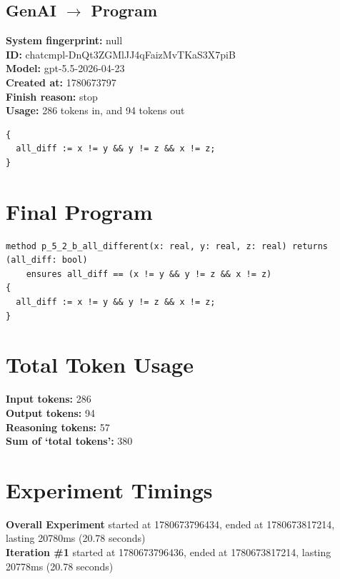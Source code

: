 \documentclass{article}
\begin{document}
\subsection*{GenAI $\rightarrow$ Program}
\textbf{System fingerprint: }null
\\\textbf{ID: }chatcmpl-DnQt3ZGMlJJ4qFaizMvTKaS3X7piB
\\\textbf{Model: }gpt-5.5-2026-04-23
\\\textbf{Created at: }1780673797
\\\textbf{Finish reason: }stop
\\\textbf{Usage: }286 tokens in, and 94 tokens out
\begin{lstlisting}
{
  all_diff := x != y && y != z && x != z;
}
\end{lstlisting}
\section*{Final Program}
\begin{lstlisting}
method p_5_2_b_all_different(x: real, y: real, z: real) returns (all_diff: bool)
	ensures all_diff == (x != y && y != z && x != z)
{
  all_diff := x != y && y != z && x != z;
}
\end{lstlisting}
\section*{Total Token Usage}
\textbf{Input tokens: }286
\\\textbf{Output tokens: }94
\\\textbf{Reasoning tokens: }57
\\\textbf{Sum of `total tokens': }380
\section*{Experiment Timings}
\textbf{Overall Experiment} started at 1780673796434, ended at 1780673817214, lasting 20780ms (20.78 seconds)
\\\textbf{Iteration \#1} started at 1780673796436, ended at 1780673817214, lasting 20778ms (20.78 seconds)
\end{document}
